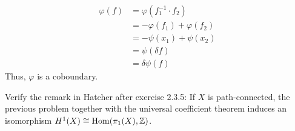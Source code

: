 \documentclass[12pt]{article}
\begin{document}
\begin{solution}
\begin{enumerate}
        \begin{align*}
            \varphi(f) &= \varphi(f_1^{-1} \cdot f_2) \\
            &= -\varphi(f_1) + \varphi(f_2) \\
            &= -\psi(x_1) + \psi(x_2) \\
            &= \psi(\delta f) \\
            &= \delta \psi(f)
        \end{align*}
        Thus, $\varphi$ is a coboundary.
    \end{enumerate}
\end{solution}
\newpage

\begin{problem}{3}
Verify the remark in Hatcher after exercise 2.3.5: If $X$ is path-connected, the previous problem together with the universal coefficient theorem induces an isomorphism $H^1(X) \cong \mathrm{Hom}(\pi_1(X), \mathbb Z)$.
\end{problem}
\end{document}
